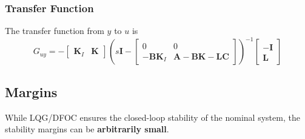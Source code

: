 \subsubsection{Transfer Function}

The transfer function from $y$ to $u$ is
\begin{equation*}
    G_{uy} = -\begin{bmatrix}
        \mathbf{K}_I & \mathbf{K}
    \end{bmatrix}
    {\left(s\mathbf{I}-\begin{bmatrix}
        0              & 0                \\
        \mathbf{-BK}_I & \mathbf{A-BK-LC}
    \end{bmatrix}\right)}^{-1}
    \begin{bmatrix}
        \mathbf{-I} \\
        \mathbf{L}
    \end{bmatrix}
\end{equation*}


\subsection{Margins}

While LQG/DFOC ensures the closed-loop stability of the nominal system, the stability margins can be \textbf{arbitrarily small}.
